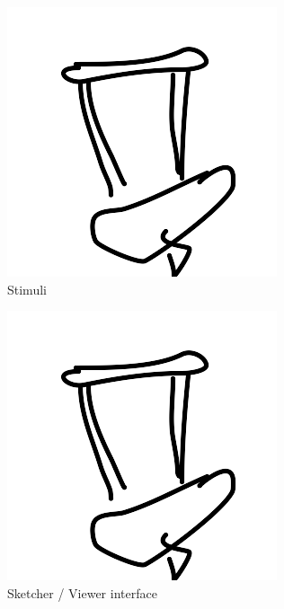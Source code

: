 \documentclass[10pt,letterpaper]{article}
\begin{document}
\begin{figure}
\begin{subfigure}{0.23\textwidth}
\includegraphics[width=\linewidth]{figures/fig_a.png}
\caption{Stimuli} \label{fig:1a}
\end{subfigure}
\hspace*{\fill}
\begin{subfigure}{0.23\textwidth}
\includegraphics[width=\linewidth]{figures/fig_b.png}
\caption{Sketcher / Viewer interface} \label{fig:1b}
\end{subfigure}
\caption{} \label{fig:1b}
\end{figure}
\end{document}
